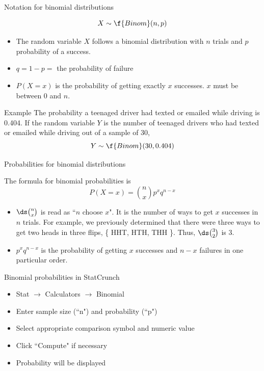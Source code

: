 \documentclass[xcolor=table]{beamer}
\begin{document}
\begin{frame}{Notation for binomial distributions}
\begin{block}{}
\[X \sim \f{Binom}(n,p)\]
\begin{itemize}
\pause\item The random variable $X$ follows a binomial distribution with $n$ trials and $p$ probability of a success.
\pause\item $q = 1- p =$ the probability of failure
\pause\item $P(X=x)$ is the probability of getting exactly $x$ successes. $x$ must be between 0 and $n$.
\end{itemize}
\end{block}
\pause
\begin{exampleblock}{Example}
The probability a teenaged driver had texted or emailed while driving is 0.404. If the random variable $Y$ is the number of teenaged drivers who had texted or emailed while driving out of a sample of 30,
\[Y \sim \f{Binom}(30, 0.404)\]
\end{exampleblock}
\end{frame}

\begin{frame}{Probabilities for binomial distributions}
\begin{block}{}
The formula for binomial probabilities is
\[ P(X=x) = \binom n x p^x q^{n-x}\]
\begin{itemize}
\pause\item $\ds \binom n x$ is read as ``$n$ choose $x$". It is the number of ways to get $x$ successes in $n$ trials. For example, we previously determined that there were three ways to get two heads in three flips, \{ HHT, HTH, THH \}. Thus, $\ds \binom 3 2$ is 3.
\pause\item $p^x q^{n-x}$ is the probability of getting $x$ successes and $n-x$ failures in one particular order.
\end{itemize}
\end{block}
\end{frame}

\begin{frame}{Binomial probabilities in StatCrunch}
\begin{block}{}
\begin{itemize}
\item Stat $\to$ Calculators $\to$ Binomial
\item Enter sample size (``n") and probability (``p")
\item Select appropriate comparison symbol and numeric value
\item Click ``Compute" if necessary
\item Probability will be displayed
\end{itemize}
\end{block}
\end{frame}
\end{document}
